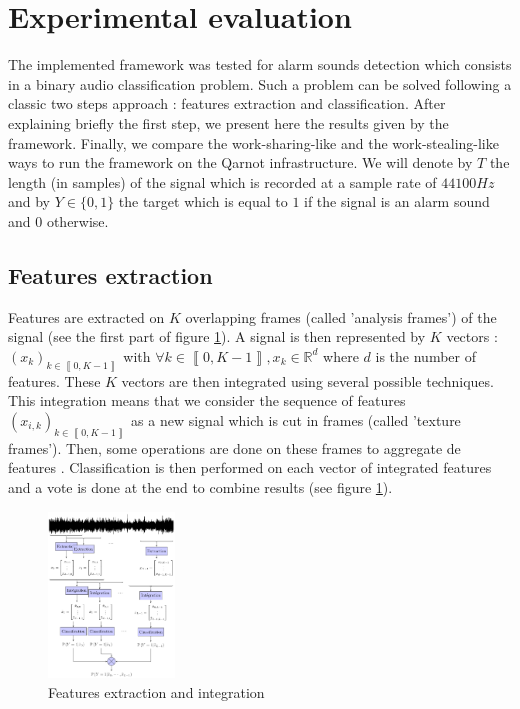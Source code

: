 \documentclass[10pt, conference, compsocconf]{IEEEtran}
\newcommand{\iseg}[1]{{\left\llbracket #1 \right\rrbracket}} %
\newcommand{\rset}{\mathbb{R}}
\begin{document}
\section{Experimental evaluation} \label{Proof-of-concept}
The implemented framework was tested for alarm sounds detection which consists in a binary audio classification problem. Such a problem can be solved following a classic two steps approach : features extraction and classification. After explaining briefly the first step, we present here the results given by the framework. Finally, we compare the work-sharing-like and the work-stealing-like ways to run the framework on the Qarnot infrastructure. We will denote by $T$ the length (in samples) of the signal which is recorded at a sample rate of $44100Hz$ and by $Y \in \{ 0, 1 \}$ the target which is equal to $1$ if the signal is an alarm sound and $0$ otherwise.
\subsection{Features extraction}
Features are extracted on $K$ overlapping frames (called 'analysis frames') of the signal (see the first part of figure \ref{fig:integration}). A signal is then represented by $K$ vectors : $(x_k)_{k \in \iseg{0,K-1}}$ with $\forall k \in \iseg{0, K-1}, x_k \in \rset^d$ where $d$ is the number of features. These $K$ vectors are then integrated using several possible techniques. This integration means that we consider the sequence of features  $\left(x_{i,k}\right)_{k \in \iseg{0,K-1}}$ as a new signal which is cut in frames (called 'texture frames'). Then, some operations are done on these frames to aggregate de features \cite{joder-essid-richard-2009}. Classification is then performed on each vector of integrated features and a vote is done at the end to combine results (see figure \ref{fig:integration}). 
\begin{figure}[h]
  \begin{center}
    \includegraphics[width=0.3\textwidth]{Figures/integration.pdf}
  \end{center}
  \caption{Features extraction and integration \label{fig:integration}} 
\end{figure}
\end{document}
